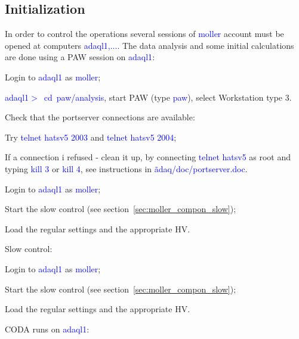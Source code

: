 {\subsection {Initialization}
\label{sec:moller_oper_initial}

In order to control the operations several sessions
of \textcolor{blue}{moller} account must be opened at computers \textcolor{blue}{adaql1,...}.
The data analysis and some initial calculations are done using a PAW\cite{PAWwww}
session on  \textcolor{blue}{adaql1}:
 \begin{list}{--}{\setlength{\itemsep}{-0.15cm}}
   \item Login to \textcolor{blue}{adaql1} as \textcolor{blue}{moller};
   \item \textcolor{blue}{adaql1$>$~cd~paw/analysis}, start PAW (type \textcolor{blue}{paw}),
   select Workstation type 3.  
 \end{list}
\noindent
Check that the portserver connections are available:
 \begin{list}{--}{\setlength{\itemsep}{-0.15cm}}
   \item Try \textcolor{blue}{telnet hatsv5 2003} and \textcolor{blue}{telnet hatsv5 2004};
   \item If a connection i refused - clean it up, by connecting
         \textcolor{blue}{telnet hatsv5} as root and typing \textcolor{blue}{kill 3} or
         \textcolor{blue}{kill 4},
         see instructions in \textcolor{blue}{\~adaq/doc/portserver.doc}.    
 \end{list}
\noindent
 \begin{list}{--}{\setlength{\itemsep}{-0.15cm}}
   \item Login to \textcolor{blue}{adaql1} as \textcolor{blue}{moller};
   \item Start the slow control (see section~\ref{sec:moller_compon_slow});
   \item Load the regular settings and the appropriate HV.
 \end{list}
Slow control:
 \begin{list}{--}{\setlength{\itemsep}{-0.15cm}}
   \item Login to \textcolor{blue}{adaql1} as \textcolor{blue}{moller};
   \item Start the slow control (see section~\ref{sec:moller_compon_slow});
   \item Load the regular settings and the appropriate HV.
 \end{list}
\noindent
CODA runs on \textcolor{blue}{adaql1}: 
 \begin{list}{--}{\setlength{\itemsep}{-0.15cm}}

\end{list}}
